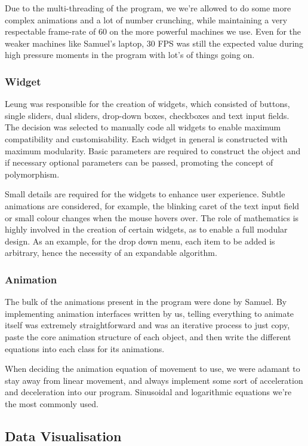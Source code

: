 \documentclass[]{article}
\begin{document}
	Due to the multi-threading of the program, we we're allowed to do some more complex animations and a lot of number crunching, while maintaining a very respectable frame-rate of 60 on the more powerful machines we use. Even for the weaker machines like Samuel's laptop, 30 FPS was still the expected value during high pressure moments in the program with lot's of things going on.
	
	\subsubsection{Widget}
	
	Leung was responsible for the creation of widgets, which consisted of buttons, single sliders, dual sliders, drop-down boxes, checkboxes and text input fields. The decision was selected to manually code all widgets to enable maximum compatibility and customisability. Each widget in general is constructed with maximum modularity. Basic parameters are required to construct the object and if necessary optional parameters can be passed, promoting the concept of polymorphism.
	
	Small details are required for the widgets to enhance user experience. Subtle animations are considered, for example, the blinking caret of the text input field or small colour changes when the mouse hovers over. The role of mathematics is highly involved in the creation of certain widgets, as to enable a full modular design. As an example, for the drop down menu, each item to be added is arbitrary, hence the necessity of an expandable algorithm.
	
	\subsubsection{Animation}
	
	The bulk of the animations present in the program were done by Samuel. By implementing animation interfaces written by us, telling everything to animate itself was extremely straightforward and was an iterative process to just copy, paste the core animation structure of each object, and then write the different equations into each class for its animations.
	
	When deciding the animation equation of movement to use, we were adamant to stay away from linear movement, and always implement some sort of acceleration and deceleration into our program. Sinusoidal and logarithmic equations we're the most commonly used. 
	
	\subsection{Data Visualisation}
	
\end{document}
